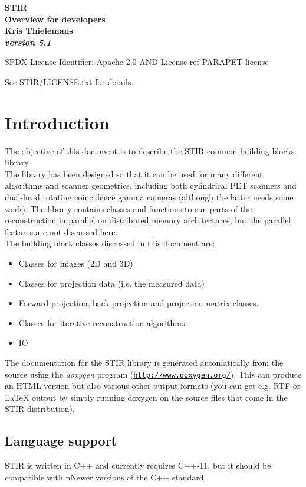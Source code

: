 \documentclass{article}
\def\R2Lurl#1#2{\mbox{\href{#1}{\tt #2}}}
\begin{document}
\begin{center}
\textbf{{\huge STIR \\
Overview for developers}}\\
\textbf{Kris Thielemans}\\
\textbf{\textit{version 5.1}}

\end{center}

SPDX-License-Identifier: Apache-2.0 AND License-ref-PARAPET-license

See STIR/LICENSE.txt for details.

\tableofcontents


\section{
Introduction}

The objective of this document is to describe the STIR common 
building blocks library.\\
The library has been designed so that it can be used for many 
different algorithms and scanner geometries, including both cylindrical 
PET scanners and dual-head rotating coincidence gamma cameras 
(although the latter needs some work). The library contains classes 
and functions to run parts of the reconstruction in parallel 
on distributed memory architectures, but the parallel features 
are not discussed here.\\
The building block classes discussed in this document are:
\begin{itemize}
\item
Classes for images (2D and 3D)
\item 
Classes for projection data (i.e. the measured data)
\item 
Forward projection, back projection and projection matrix classes.
\item 
Classes for iterative reconstruction algorithms
\item IO
\end{itemize}

The documentation
for the STIR library is generated automatically from the source 
using the \textit{doxygen} program (\R2Lurl{http://www.doxygen.org/ }{http://www.doxygen.org/}). 
This can produce an HTML version but also various other output 
formats (you can get e.g. RTF or LaTeX output by simply running 
doxygen on the source files that come in the STIR distribution). 

\subsection{Language support}
STIR is written in C++ and currently requires C++-11, but it should be compatible with nNewer versions of the C++ standard.
\end{document}
